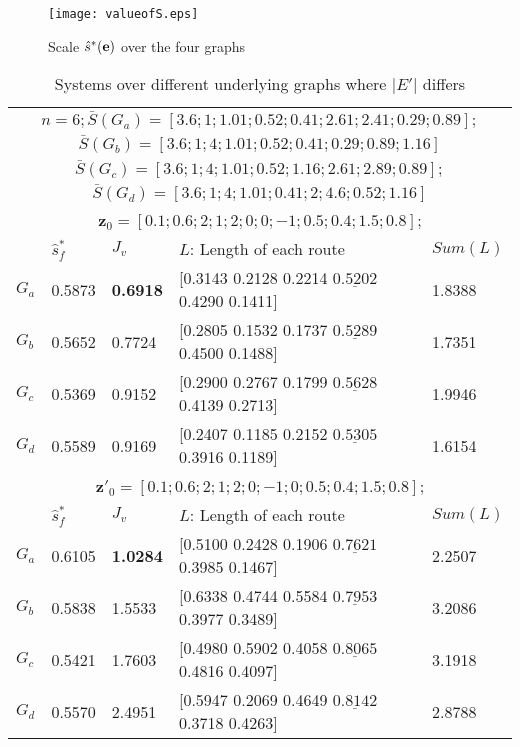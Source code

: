\documentclass[times]{rncauth}
\newcommand{\be}{\ensuremath \mathbf{e}}
\begin{document}
\begin{figure}
\begin{center}
\texttt{[image: valueofS.eps]}
\caption{Scale $\hat{s}^*(\be)$ over the four
graphs}\label{fig:valueofS}
\end{center}
\end{figure}

\begin{table}
  \caption{Systems over different underlying graphs where $|E'|$ differs}
  \label{table:six}
 \begin{center}
\begin{lrbox}{\tablebox}
\begin{tabular}{|l|l|l|l|l|}
\hline \multicolumn{5}{|c|}{$n=6;
\bar{S}(G_a)=[3.6;1;1.01;0.52;0.41;2.61;2.41;0.29;0.89];$}\\
\multicolumn{5}{|c|}{$\bar{S}(G_b)
=[3.6;1;4;1.01;0.52;0.41;0.29;0.89;1.16]$} \\
\multicolumn{5}{|c|}{
$\bar{S}(G_c)=[3.6;1;4;1.01;0.52;1.16;2.61;2.89;0.89];$}\\
\multicolumn{5}{|c|}{$\bar{S}(G_d)
=[3.6;1;4;1.01;0.41;2;4.6;0.52;1.16]$} \\
\hline
\multicolumn{5}{|c|}{$\mathbf{z}_0=[0.1;0.6;2;1;2;0;0;-1;0.5;0.4;1.5;0.8]$;}\\
\hline
& $\hat{s}^*_f$  & $J_v$  &  $L$: Length of each route & $Sum(L)$\\
\hline
$G_a$ &0.5873 & \textbf{0.6918} & [0.3143  0.2128  0.2214  $\underline{0.5202}$  0.4290  0.1411]& 1.8388\\
$G_b$& 0.5652 & 0.7724  &[0.2805  0.1532  0.1737  $\underline{0.5289}$  0.4500  0.1488] &1.7351\\
$G_c$ & 0.5369& 0.9152&  [0.2900  0.2767  0.1799  $\underline{0.5628}$  0.4139  0.2713]  &  1.9946\\
$G_d$& 0.5589  &0.9169 & [0.2407  0.1185  0.2152  $\underline{0.5305}$  0.3916  0.1189]  &  1.6154\\
\hline \multicolumn{5}{|c|}{$\mathbf{z}'_0=[0.1;0.6;2;1;2;0;-1;0;0.5;0.4;1.5;0.8]$;}\\
\hline
& $\hat{s}^*_f$  & $J_v$  &  $L$: Length of each route & $Sum(L)$\\
\hline
$G_a$ &0.6105 & \textbf{1.0284}  &[0.5100  0.2428  0.1906  $\underline{0.7621}$  0.3985 0.1467]& 2.2507\\
$G_b$& 0.5838  &1.5533  &[0.6338  0.4744  0.5584  $\underline{0.7953}$  0.3977 0.3489] &3.2086\\
$G_c$& 0.5421  &1.7603 & [0.4980  0.5902  0.4058  $\underline{0.8065}$  0.4816 0.4097] &3.1918\\
$G_d$& 0.5570  &2.4951&  [0.5947  0.2069  0.4649  $\underline{0.8142}$  0.3718 0.4263] &2.8788\\
\hline
\end{tabular}
\end{lrbox}
\scalebox{0.7}{\usebox{\tablebox}}
\end{center}
\end{table}
\end{document}
